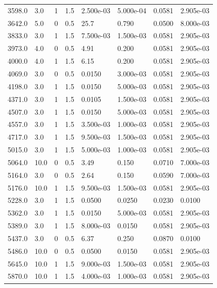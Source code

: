 \documentclass[preview]{standalone}
\begin{document}
{{\begin{tabular}{L{1.2cm}C{1.2cm} C{0.3cm}C{0.5cm} C{1.4cm}C{1.4cm} C{1.4cm}C{1.4cm}}
  3598.0  &   3.0  & 1     & 1.5 &  2.500e-03  & 5.000e-04  & 0.0581 &  2.905e-03   \\ 
  3642.0  &   5.0  & 0     & 0.5 &  25.7  & 0.790  & 0.0500 &  8.000e-03   \\ 
  3833.0  &   3.0  & 1     & 1.5 &  7.500e-03  & 1.500e-03  & 0.0581 &  2.905e-03   \\ 
  3973.0  &   4.0  & 0     & 0.5 &  4.91  & 0.200  & 0.0581 &  2.905e-03   \\ 
  4000.0  &   4.0  & 1     & 1.5 &  6.15  & 0.200  & 0.0581 &  2.905e-03   \\ 
  4069.0  &   3.0  & 0     & 0.5 &  0.0150  & 3.000e-03  & 0.0581 &  2.905e-03   \\ 
  4198.0  &   3.0  & 1     & 1.5 &  0.0150  & 5.000e-03  & 0.0581 &  2.905e-03   \\ 
  4371.0  &   3.0  & 1     & 1.5 &  0.0105  & 1.500e-03  & 0.0581 &  2.905e-03   \\ 
  4507.0  &   3.0  & 1     & 1.5 &  0.0150  & 5.000e-03  & 0.0581 &  2.905e-03   \\ 
  4557.0  &   3.0  & 1     & 1.5 &  3.500e-03  & 1.000e-03  & 0.0581 &  2.905e-03   \\ 
  4717.0  &   3.0  & 1     & 1.5 &  9.500e-03  & 1.500e-03  & 0.0581 &  2.905e-03   \\ 
  5015.0  &   3.0  & 1     & 1.5 &  5.000e-03  & 1.000e-03  & 0.0581 &  2.905e-03   \\ 
  5064.0  &  10.0  & 0     & 0.5 &  3.49  & 0.150  & 0.0710 &  7.000e-03   \\ 
  5164.0  &   3.0  & 0     & 0.5 &  2.64  & 0.150  & 0.0590 &  7.000e-03   \\ 
  5176.0  &  10.0  & 1     & 1.5 &  9.500e-03  & 1.500e-03  & 0.0581 &  2.905e-03   \\ 
  5228.0  &   3.0  & 1     & 1.5 &  0.0500  & 0.0250  & 0.0230 &  0.0100   \\ 
  5362.0  &   3.0  & 1     & 1.5 &  0.0150  & 5.000e-03  & 0.0581 &  2.905e-03   \\ 
  5389.0  &   3.0  & 1     & 1.5 &  8.000e-03  & 0.0150  & 0.0581 &  2.905e-03   \\ 
  5437.0  &   3.0  & 0     & 0.5 &  6.37  & 0.250  & 0.0870 &  0.0100   \\ 
  5486.0  &  10.0  & 0     & 0.5 &  0.0500  & 0.0150  & 0.0581 &  2.905e-03   \\ 
  5645.0  &  10.0  & 1     & 1.5 &  9.000e-03  & 1.500e-03  & 0.0581 &  2.905e-03   \\ 
  5870.0  &  10.0  & 1     & 1.5 &  4.000e-03  & 1.000e-03  & 0.0581 &  2.905e-03   \\ 

\end{tabular}}}
\end{document}

